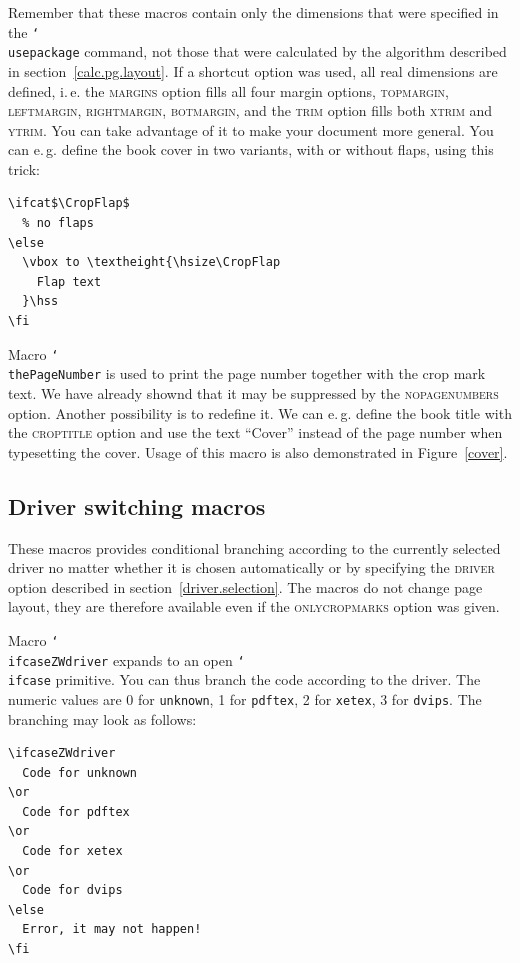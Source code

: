 \documentclass[11pt]{article}
\makeatletter
\def\mg#1{\ifvmode\leavevmode\fi\marginpar{\texttt{#1}}\ignorespaces}
\def\cmg#1{\mg{\char`\\#1}}
\def\opt#1{\texorpdfstring{\textmd{\textsc{#1}}}{#1}}
\DeclareRobustCommand\cmd[1]{\texttt{\char`\\#1}}
\def\ie.{i.\,e.\@}
\def\eg.{e.\,g.\@}
\let\zwcomma\,
\def\,{\texorpdfstring{\zwcomma}{}}
\makeatother
\begin{document}
Remember that these macros contain only the dimensions that were specified in the \cmd{usepackage}
command, not those that were calculated by the algorithm described in section~\ref{calc.pg.layout}.
If a shortcut option was used, all real dimensions are defined, \ie. the \opt{margins} option fills
all four margin options, \opt{topmargin}, \opt{leftmargin}, \opt{rightmargin}, \opt{botmargin}, and
the \opt{trim} option fills both \opt{xtrim} and \opt{ytrim}. You can take advantage of it to make
your document more general. You can \eg. define the book cover in two variants, with or without
flaps, using this trick:

\vb
\begin{verbatim}
\ifcat$\CropFlap$
  % no flaps
\else
  \vbox to \textheight{\hsize\CropFlap
    Flap text
  }\hss
\fi
\end{verbatim}

\vb

\cmg{thePageNumber}
Macro \cmd{thePageNumber} is used to print the page number together with the crop mark text. We have
already shownd that it may be suppressed by the \opt{nopagenumbers} option. Another possibility is
to redefine it. We can \eg. define the book title with the \opt{croptitle} option and use the
text ``Cover'' instead of the page number when typesetting the cover. Usage of this macro is also
demonstrated in Figure~\ref{cover}.

\subsection{Driver switching macros}\label{driver.switching}
These macros provides conditional branching according to the currently selected driver no matter
whether it is chosen automatically or by specifying the \opt{driver} option described in
section~\ref{driver.selection}. The macros do not change page layout, they are therefore available
even if the \opt{onlycropmarks} option was given.

\cmg{ifcaseZWdriver}
Macro \cmd{ifcaseZWdriver} expands to an open \cmd{ifcase} primitive. You can thus branch the code
according to the driver. The numeric values are 0 for \texttt{unknown}, 1 for \texttt{pdftex}, 2
for \texttt{xetex}, 3 for \texttt{dvips}. The branching may look as follows:

\vb
\begin{verbatim}
\ifcaseZWdriver
  Code for unknown
\or
  Code for pdftex
\or
  Code for xetex
\or
  Code for dvips
\else
  Error, it may not happen!
\fi
\end{verbatim}
\end{document}
